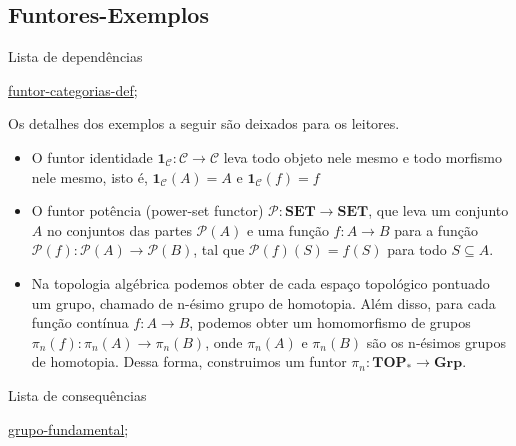 \subsection{Funtores-Exemplos}
\label{funtor-categorias-ex}
\begin{titlemize}{Lista de dependências}
	\item \hyperref[funtor-categorias-def]{funtor-categorias-def};\\ %
\end{titlemize}

\begin{ex}
	Os detalhes dos exemplos a seguir são deixados para os leitores.
\begin{itemize}

    \item O funtor identidade $\mathbf{1}_{\mathcal{C}}: \mathcal{C} \longrightarrow \mathcal{C}$ leva todo objeto nele mesmo e todo morfismo nele mesmo, isto é, $\mathbf{1}_{\mathcal{C}}(A) = A$ e $\mathbf{1}_{\mathcal{C}}(f) = f$
    
    \item O funtor potência (power-set functor) $\mathcal{P}:\mathbf{SET} \longrightarrow \mathbf{SET}$, que leva um conjunto $A$ no conjuntos das partes $\mathcal{P}(A)$ e uma função $f:A \longrightarrow B$ para a função $\mathcal{P}(f): \mathcal{P}(A) \longrightarrow \mathcal{P}(B)$, tal que $\mathcal{P}(f)(S) = f(S)$ para todo $S \subseteq A$.

    \item Na topologia algébrica podemos obter de cada espaço topológico pontuado um grupo, chamado de n-ésimo grupo de homotopia. Além disso, para cada função contínua $f: A \longrightarrow B$, podemos obter um homomorfismo de grupos $\pi_n(f):\pi_n(A) \longrightarrow \pi_n(B)$, onde $\pi_n(A)$ e $\pi_n(B)$ são os n-ésimos grupos de homotopia. Dessa forma, construimos um funtor $\pi_n: \mathbf{TOP}_* \longrightarrow \mathbf{Grp}$. 

\end{itemize}
\end{ex}

 

\begin{titlemize}{Lista de consequências}
	\item \hyperref[grupo-fundamental]{grupo-fundamental};\\ %
\end{titlemize}
